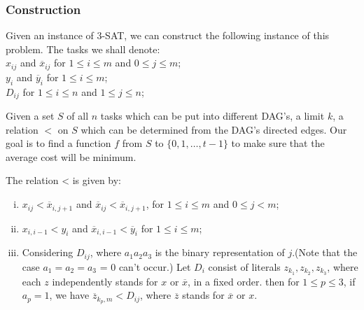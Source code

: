 \begin{frame}[allowframebreaks=0.8]
\frametitle{Construction}
     Given an instance of \textsc{3-SAT}, we can construct the following instance of this problem. The tasks we shall denote:\\
        $x_{ij}$ and $\overline x_{ij}$ for $1 \leq i \leq m$ and $0 \leq j \leq m$;\\
        $y_i$ and $\overline y_i$ for $1 \leq i \leq m$;\\
        $D_{ij}$ for $1 \leq i \leq n$ and $1 \leq j \leq n$;
    
     Given a set $S$ of all $n$ tasks which can be put into different DAG's, a limit $k$, a relation $<$ on $S$ which can be determined from the DAG's directed edges. Our goal is to find a function $f$ from $S$ to $\{0,1,\ldots,t-1\}$ to make sure that the average cost will be minimum.
     \framebreak
     
    The relation < is given by:
    \begin{enumerate}[(i)]
    \item $x_{ij} < \overline x_{i,j+1}$ and $\overline x_{ij} < \overline x_{i,j+1}$, for $1 \leq i \leq m$ and $0 \leq j < m$;
    \item $x_{i,i-1} < y_i$ and $\overline x_{i,i-1} < \overline y_i$ for $1 \leq i \leq m$;
    \item Considering $D_{ij}$, where $a_1 a_2 a_3$ is the binary representation of $j$.(Note that the case $a_1 = a_2 = a_3$ = 0 can't occur.) Let $D_i$ consist of literals $z_{k_1},z_{k_2},z_{k_3}$, where each $z$ independently stands for $x$ or $\overline x$, in a fixed order. then for $1 \leq p \leq 3$, if $a_p = 1$, we have $\overline z_{k_p,m} < D_{ij}$, where $\overline z$ stands for $\overline x$ or $x$.
    \end{enumerate}

\end{frame}

